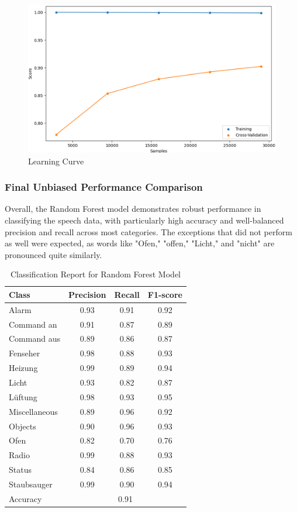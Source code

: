 \begin{figure}[!ht]
	\centering
	\includegraphics[scale=0.5]{fig/rfc_learning_curve.png}
	\vspace{-0.3cm}
	\caption{Learning Curve}
	\label{fig:rfc_learning_curve}
	\vspace{-0.1cm}
\end{figure}
\subsubsection{Final Unbiased Performance Comparison}
Overall, the Random Forest model demonstrates robust performance in classifying the speech data, with particularly high accuracy and well-balanced precision and recall across most categories. The exceptions that did not perform as well were expected, as words like "Ofen," "offen," "Licht," and "nicht" are pronounced quite similarly.

\begin{table}
  \caption{Classification Report for Random Forest Model}
\label{tab:classification_report}
  \centering
  \begin{tabular}{lccc}
    \toprule
    Class        & Precision & Recall & F1-score \\
    \midrule
    Alarm        & 0.93 & 0.91 & 0.92 \\
    Command an   & 0.91 & 0.87 & 0.89 \\
    Command aus  & 0.89 & 0.86 & 0.87 \\
    Fenseher     & 0.98 & 0.88 & 0.93 \\
    Heizung      & 0.99 & 0.89 & 0.94 \\
    Licht        & 0.93 & 0.82 & 0.87 \\
    Lüftung      & 0.98 & 0.93 & 0.95 \\
    Miscellaneous & 0.89 & 0.96 & 0.92 \\
    Objects      & 0.90 & 0.96 & 0.93 \\
    Ofen         & 0.82 & 0.70 & 0.76 \\
    Radio        & 0.99 & 0.88 & 0.93 \\
    Status       & 0.84 & 0.86 & 0.85 \\
    Staubsauger  & 0.99 & 0.90 & 0.94 \\
    \midrule
    Accuracy     & \multicolumn{3}{c}{0.91} \\
    \bottomrule
  \end{tabular}
\end{table}

